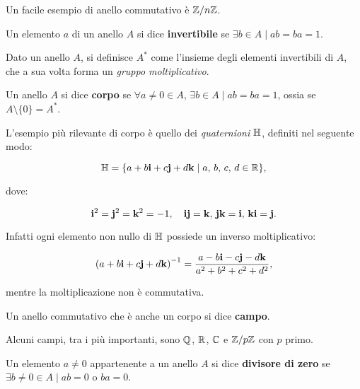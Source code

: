 \begin{example}
    Un facile esempio di anello commutativo è $\mathbb Z/n\mathbb Z$.
\end{example}

\begin{definition}
    Un elemento $a$ di un anello $A$ si dice \textbf{invertibile} se
    $\exists b \in A \mid ab = ba = 1$.
\end{definition}

\begin{definition}
    Dato un anello $A$, si definisce $A^*$ come l'insieme degli elementi
    invertibili di $A$, che a sua volta forma un \textit{gruppo moltiplicativo}.
\end{definition}

\begin{definition}
    Un anello $A$ si dice \textbf{corpo} se $\forall a \neq 0 \in A$, $\exists b \in A \mid ab=ba=1$,
    ossia se $A \setminus \{0\} = A^*$.
\end{definition}

\begin{example}
    L'esempio più rilevante di corpo è quello dei \textit{quaternioni} $\mathbb{H}$, definiti
    nel seguente modo:

    \[\mathbb{H} = \{a+b\mathbf{i}+c\mathbf{j}+d\mathbf{k} \mid a,\, b,\, c,\, d \in \mathbb R\},\]

    dove:

    \[\mathbf{i}^2 = \mathbf{j}^2 = \mathbf{k}^2 = -1, \quad \mathbf{i}\mathbf{j} = \mathbf{k},\, \mathbf{j}\mathbf{k} = \mathbf{i},\, \mathbf{k}\mathbf{i} = \mathbf{j}. \]

    Infatti ogni elemento non nullo di $\mathbb{H}$ possiede un inverso moltiplicativo:

    \[\left(a+b\mathbf{i}+c\mathbf{j}+d\mathbf{k}\right)^{-1} = \frac{a-b\mathbf{i}-c\mathbf{j}-d\mathbf{k}}{a^2+b^2+c^2+d^2},\]

    mentre la moltiplicazione non è commutativa.

\end{example}

\begin{definition}
    Un anello commutativo che è anche un corpo si dice \textbf{campo}.
\end{definition}

\begin{example}
    Alcuni campi, tra i più importanti, sono $\mathbb Q$, $\mathbb R$, $\mathbb C$ e $\mathbb Z/p\mathbb Z$ con
    $p$ primo.
\end{example}

\begin{definition}
    Un elemento $a \neq 0$ appartenente a un anello $A$ si dice \textbf{divisore di zero} se
    $\exists b \neq 0 \in A \mid ab = 0$ o $ba = 0$.
\end{definition}


